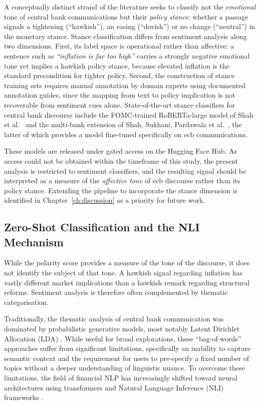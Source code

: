 A conceptually distinct strand of the literature seeks to classify not the \emph{emotional} tone of central bank communications but their \emph{policy stance}: whether a passage signals a tightening (``hawkish''), an easing (``dovish'') or no change (``neutral'') in the monetary stance. Stance classification differs from sentiment analysis along two dimensions. First, its label space is operational rather than affective: a sentence such as \textit{``inflation is far too high''} carries a strongly negative emotional tone yet implies a hawkish policy stance, because elevated inflation is the standard precondition for tighter policy. Second, the construction of stance training sets requires manual annotation by domain experts using documented annotation guides, since the mapping from text to policy implication is not recoverable from sentiment cues alone. State-of-the-art stance classifiers for central bank discourse include the FOMC-trained RoBERTa-large model of Shah et al.\ \cite{shah2023trillion} and the multi-bank extension of Shah, Sukhani, Pardawala et al.\ \cite{shah2025wcb}, the latter of which provides a model fine-tuned specifically on \gls{ecb} communications.

These models are released under gated access on the Hugging Face Hub. As access could not be obtained within the timeframe of this study, the present analysis is restricted to sentiment classifiers, and the resulting signal should be interpreted as a measure of the \emph{affective tone} of \gls{ecb} discourse rather than its policy stance. Extending the pipeline to incorporate the stance dimension is identified in Chapter~\ref{ch:discussion} as a priority for future work.

\subsection{Zero-Shot Classification and the NLI Mechanism}
\label{sec:nlp_finance}
While the polarity score provides a measure of the tone of the discourse, it does not identify the subject of that tone. A hawkish signal regarding inflation has vastly different market implications than a hawkish remark regarding structural reforms. Sentiment analysis is therefore often complemented by thematic categorisation.

Traditionally, the thematic analysis of central bank communication was dominated by probabilistic generative models, most notably Latent Dirichlet Allocation (LDA) \cite{blei2003latent}. While useful for broad explorations, these ``bag-of-words'' approaches suffer from significant limitations, specifically an inability to capture semantic context and the requirement for users to pre-specify a fixed number of topics without a deeper understanding of linguistic nuance. To overcome these limitations, the field of financial NLP has increasingly shifted toward neural architectures using transformers and Natural Language Inference (NLI) frameworks \cite{yin2019benchmarking}.

